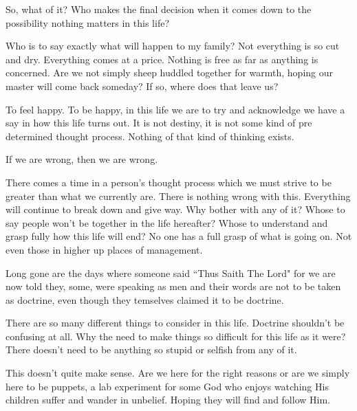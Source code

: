 So, what of it? Who makes the final decision when it comes down to the
possibility nothing matters in this life?

Who is to say exactly what will happen to my family? Not everything is so cut
and dry. Everything comes at a price. Nothing is free as far as anything is
concerned. Are we not simply sheep huddled together for warmth, hoping our
master will come back someday? If so, where does that leave us?

To feel happy. To be happy, in this life we are to try and acknowledge we have a
say in how this life turns out. It is not destiny, it is not some kind of pre
determined thought process. Nothing of that kind of thinking exists.

If we are wrong, then we are wrong.

There comes a time in a person's thought process which we must strive to be
greater than what we currently are. There is nothing wrong with this. Everything
will continue to break down and give way. Why bother with any of it? Whose to
say people won't be together in the life hereafter? Whose to understand and
grasp fully how this life will end? No one has a full grasp of what is going on.
Not even those in higher up places of management.

Long gone are the days where someone said ``Thus Saith The Lord" for we are now
told they, some, were speaking as men and their words are not to be taken as
doctrine, even though they temselves claimed it to be doctrine.

There are so many different things to consider in this life. Doctrine shouldn't
be confusing at all. Why the need to make things so difficult for this life as
it were? There doesn't need to be anything so stupid or selfish from any of it.

This doesn't quite make sense. Are we here for the right reasons or are we
simply here to be puppets, a lab experiment for some God who enjoys watching His
children suffer and wander in unbelief. Hoping they will find and follow Him.